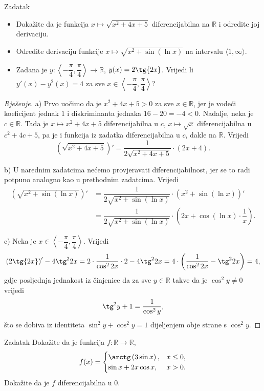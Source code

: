 \begin{exercise}{Zadatak} \textbf{}
\begin{itemize}
\item[a)] Dokažite da je funkcija \(x\mapsto \sqrt{x^2+4x+5}\) diferencijabilna na \(\mathbb{R}\) i odredite joj derivaciju.
\item[b)] Odredite derivaciju funkcije \(x\mapsto \sqrt{x^2+\sin(\ln{x})}\) na intervalu \(\langle 1,\infty\rangle\).
\item[c)] Zadana je \(y : \left\langle -\dfrac{\pi}{4}, \dfrac{\pi}{4}\right\rangle\to \mathbb{R}\), \(y(x)=2\tg{2x}\). Vrijedi li \(y'(x)-y^2(x)=4\) za sve \(x\in \left\langle -\dfrac{\pi}{4}, \dfrac{\pi}{4}\right\rangle\)?
\end{itemize}
\end{exercise}
\begin{proof}[Rješenje]
a) Prvo uočimo da je \(x^2+4x+5>0\) za sve \(x\in \mathbb{R}\), jer je vodeći koeficijent jednak \(1\) i diskriminanta jednaka \(16-20=-4<0\). Nadalje, neka je \(c\in \mathbb{R}\). Tada je \(x\mapsto x^2+4x+5\) diferencijabilna u \(c\), \(x\mapsto \sqrt{x}\) diferencijabilna u \(c^2+4c+5\), pa je i funkcija iz zadatka diferencijabilna u \(c\), dakle na \(\mathbb{R}\). Vrijedi
\[\left(\sqrt{x^2+4x+5}\right)'=\dfrac{1}{2\sqrt{x^2+4x+5}}\cdot\left(2x+4\right).\]

b) U narednim zadatcima nećemo provjeravati diferencijabilnost, jer se to radi potpuno analogno kao u prethodnim zadatcima. Vrijedi
\begin{align*}
\left(\sqrt{x^2+\sin(\ln{x})}\right)'&=\dfrac{1}{2\sqrt{x^2+\sin(\ln{x})}}\cdot \left(x^2+\sin\left(\ln{x}\right)\right)'\\
&=\dfrac{1}{2\sqrt{x^2+\sin(\ln{x})}}\cdot \left(2x+\cos\left(\ln{x}\right)\cdot\dfrac{1}{x}\right).
\end{align*}

c) Neka je \(x\in \left\langle -\dfrac{\pi}{4}, \dfrac{\pi}{4}\right\rangle\). Vrijedi
\[\left(2\tg{2x}\right)'-4\tg^2{2x}=2\cdot\dfrac{1}{\cos^2{2x}}\cdot 2-4\tg^2{2x}=4\cdot \left(\dfrac{1}{\cos^2{2x}}-\tg^2{2x}\right)=4,\]
gdje posljednja jednakost iz činjenice da za sve \(y\in \mathbb{R}\) takve da je \(\cos^2{y}\neq 0\) vrijedi \[\tg^2{y}+1=\dfrac{1}{\cos^2{y}},\]
što se dobiva iz identiteta \(\sin^2{y}+\cos^2{y}=1\) dijeljenjem obje strane s \(\cos^2{y}\).
\end{proof}
\begin{exercise}{Zadatak}
Dokažite da je funkcija \(f : \mathbb{R}\to \mathbb{R}\),
\[f(x)=\begin{cases}
\arctg\left(3\sin{x}\right),& x\leq 0,\\
\sin{x}+2x\cos{x},& x>0.
\end{cases}\]
Dokažite da je \(f\) diferencijabilna u \(0\).
\end{exercise}
